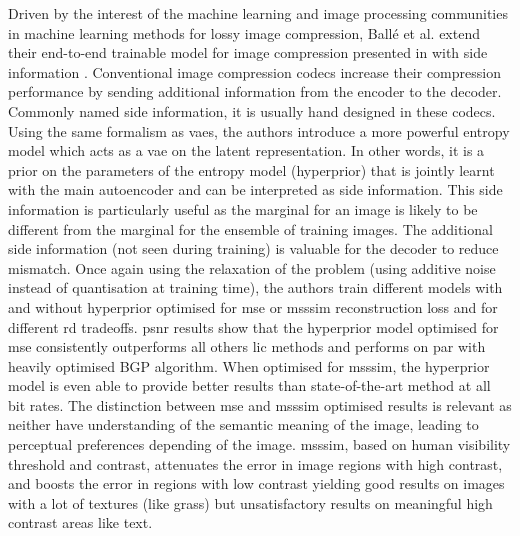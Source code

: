 Driven by the interest of the machine learning and image processing communities in machine learning methods for lossy image compression, Ballé et al. extend their end-to-end trainable model for image compression presented in \cite{ballé2017endtoendoptimizedimagecompression} with side information \cite{ballé2018variationalimagecompressionscale}. Conventional image compression codecs increase their compression performance by sending additional information from the encoder to the decoder. Commonly named side information, it is usually hand designed in these codecs. Using the same formalism as \acrshort{vae}s, the authors introduce a more powerful entropy model which acts as a \acrshort{vae} on the latent representation. In other words, it is a prior on the parameters of the entropy model (hyperprior) that is jointly learnt with the main autoencoder and can be interpreted as side information. This side information is particularly useful as the marginal for an image is likely to be different from the marginal for the ensemble of training images. The additional side information (not seen during training) is valuable for the decoder to reduce mismatch. Once again using the relaxation of the problem (using additive noise instead of quantisation at training time), the authors train different models with and without hyperprior optimised for \acrshort{mse} or \acrshort{msssim} reconstruction loss and for different \acrshort{rd} tradeoffs. \acrshort{psnr} results show that the hyperprior model optimised for \acrshort{mse} consistently outperforms all others \acrshort{lic} methods and performs on par with heavily optimised BGP algorithm. When optimised for \acrshort{msssim}, the hyperprior model is even able to provide better results than state-of-the-art method at all bit rates. The distinction between \acrshort{mse} and \acrshort{msssim} optimised results is relevant as neither have understanding of the semantic meaning of the image, leading to perceptual preferences depending of the image. \acrshort{msssim}, based on human visibility threshold and contrast, attenuates the error in image regions with high contrast, and boosts the error in regions with low contrast yielding good results on images with a lot of textures (like grass) but unsatisfactory results on meaningful high contrast areas like text.


